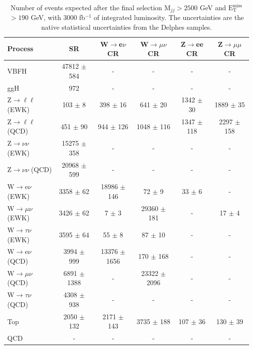 \documentclass[../report.tex]{subfiles}
\newcommand{\MET}{\ensuremath{\mathrm{E}_{\mathrm{T}}^{\mathrm{miss}}}}
\begin{document}
 \begin{table}[h!]
     \centering

\begin{tabular}{l|c|c|c|c|c}
\hline
Process & SR          &     W$\rightarrow$e$\nu$ CR      &   W$\rightarrow \mu\nu$ CR      &   Z$\rightarrow$ee CR      & Z$\rightarrow \mu\mu$ CR  \\
\hline
VBFH & 47812 $\pm$ 584       & - & - & - & - \\
ggH & 972  & - & - & - & - \\
\hline
Z$\rightarrow \ell\ell$ (EWK) & 103 $\pm$ 8   & 398 $\pm$ 16 & 641 $\pm$ 20 & 1342 $\pm$ 30 & 1889 $\pm$ 35 \\
Z$\rightarrow \ell\ell$ (QCD) & 451 $\pm$ 90   & 944 $\pm$ 126 & 1048 $\pm$ 116 & 1347 $\pm$ 118 & 2297 $\pm$ 158 \\
\hline
Z$\rightarrow\nu\nu$ (EWK) & 15275 $\pm$ 358       & - & - & - & - \\
Z$\rightarrow\nu\nu$ (QCD) & 20968 $\pm$ 599       & - & - & - & - \\
\hline
W$\rightarrow$e$\nu$ (EWK) & 3358 $\pm$ 62      & 18986 $\pm$ 146 & 72 $\pm$ 9 & 33 $\pm$ 6 & - \\
W$\rightarrow \mu\nu$ (EWK) & 3426 $\pm$ 62     & 7 $\pm$ 3 & 29360 $\pm$ 181 & - & 17 $\pm$ 4 \\
W$\rightarrow \tau\nu$ (EWK) & 3595  $\pm$ 64   & 55 $\pm$ 8 & 87 $\pm$ 10 & - & - \\
\hline
W$\rightarrow$e$\nu$ (QCD) & 3994  $\pm$ 999   & 13376 $\pm$ 1656 & 170 $\pm$ 168 &  - & - \\
W$\rightarrow \mu\nu$ (QCD) & 6891 $\pm$ 1388  & - & 23322 $\pm$ 2096 & - & - \\
W$\rightarrow \tau\nu$ (QCD) & 4308 $\pm$ 938  & -       & -       & -       & - \\
\hline
Top & 2050 $\pm$  132   &  2171 $\pm$ 143 & 3735 $\pm$ 188 & 107 $\pm$ 36 & 130 $\pm$ 39 \\
QCD & -    & -       & -       & -       & -\\
\hline
\end{tabular}
\caption{Number of events expected after the final selection M$_{jj}>2500$ GeV and \MET$>190$ GeV, with 3000 fb$^{-1}$ of integrated luminosity. The uncertainties are the native statistical uncertainties from the Delphes samples.}
\label{tab:yieldsYR18}
  \end{table}
\end{document}

